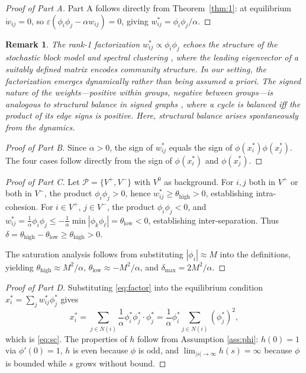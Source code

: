 \documentclass[3p]{elsarticle}
\newtheorem{remark}{Remark}
\newcommand{\eps}{\varepsilon}
\begin{document}
\begin{proof}[Proof of Part A]
Part A follows directly from Theorem~\ref{thm:1}: at equilibrium $\dot w_{ij}=0$, so $\eps(\phi_i\phi_j - \alpha w_{ij})=0$, giving $w_{ij}^* = \phi_i\phi_j/\alpha$.
\end{proof}

\begin{remark}
The rank-1 factorization $w_{ij}^* \propto \phi_i\phi_j$ echoes the structure of the stochastic block model \cite{abbe2018community} and spectral clustering \cite{vonluxburg2007tutorial}, where the leading eigenvector of a suitably defined matrix encodes community structure. In our setting, the factorization emerges dynamically rather than being assumed a priori. The signed nature of the weights---positive within groups, negative between groups---is analogous to structural balance in signed graphs \cite{cartwright1956structural}, where a cycle is balanced iff the product of its edge signs is positive. Here, structural balance arises spontaneously from the dynamics.
\end{remark}

\begin{proof}[Proof of Part B]
Since $\alpha>0$, the sign of $w_{ij}^*$ equals the sign of $\phi(x_i^*)\phi(x_j^*)$. The four cases follow directly from the sign of $\phi(x_i^*)$ and $\phi(x_j^*)$.
\end{proof}

\begin{proof}[Proof of Part C]
Let $\mathcal{P}=\{V^+,V^-\}$ with $V^0$ as background. For $i,j$ both in $V^+$ or both in $V^-$, the product $\phi_i\phi_j>0$, hence $w_{ij}^*\ge\theta_{\text{high}}>0$, establishing intra-cohesion. For $i\in V^+$, $j\in V^-$, the product $\phi_i\phi_j<0$, and $w_{ij}^* = \frac{1}{\alpha}\phi_i\phi_j \le -\frac{1}{\alpha}\min|\phi_k\phi_\ell| = \theta_{\text{low}} < 0$, establishing inter-separation. Thus $\delta = \theta_{\text{high}} - \theta_{\text{low}} \ge \theta_{\text{high}} > 0$.

The saturation analysis follows from substituting $|\phi_i|\approx M$ into the definitions, yielding $\theta_{\text{high}}\approx M^2/\alpha$, $\theta_{\text{low}}\approx -M^2/\alpha$, and $\delta_{\max}=2M^2/\alpha$.
\end{proof}

\begin{proof}[Proof of Part D]
Substituting \eqref{eq:factor} into the equilibrium condition $x_i^* = \sum_j w_{ij}^*\phi_j^*$ gives
\[
x_i^* = \sum_{j\in N(i)} \frac{1}{\alpha}\phi_i^*\phi_j^*\cdot\phi_j^* = \frac{1}{\alpha}\phi_i^*\sum_{j\in N(i)} (\phi_j^*)^2,
\]
which is \eqref{eq:sc}. The properties of $h$ follow from Assumption \ref{ass:phi}: $h(0)=1$ via $\phi'(0)=1$, $h$ is even because $\phi$ is odd, and $\lim_{|s|\to\infty} h(s)=\infty$ because $\phi$ is bounded while $s$ grows without bound.
\end{proof}
\end{document}
